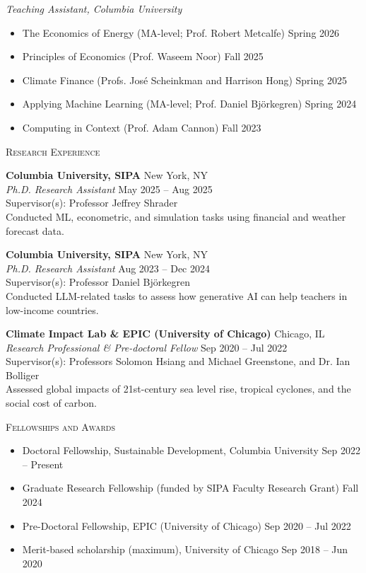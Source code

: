\documentclass[11pt, letterpaper]{article}
\newcommand{\cvsection}[1]{%
    \par\vspace{9pt}%
    {\Large\scshape #1}\ \hrulefill\par\nopagebreak
    \vspace{3pt}%
}
\newcommand{\workentry}[6]{%
    \textbf{#1} \hfill #2\\
    \textit{#3} \hfill #4\\
    Supervisor(s): #5\\
    #6\par\vspace{4pt}%
}
\newenvironment{datedlist}
    {\begin{itemize}[noitemsep,topsep=0pt,partopsep=0pt,leftmargin=0pt,label={}]}
    {\end{itemize}\vspace{4pt}}
\begin{document}
\textit{Teaching Assistant, Columbia University}\par\vspace{2pt}
\begin{datedlist}
    \item The Economics of Energy (MA-level; Prof. Robert Metcalfe) \hfill Spring 2026
    \item Principles of Economics (Prof. Waseem Noor) \hfill Fall 2025
    \item Climate Finance (Profs. José Scheinkman and Harrison Hong) \hfill Spring 2025
    \item Applying Machine Learning (MA-level; Prof. Daniel Björkegren) \hfill Spring 2024
    \item Computing in Context (Prof. Adam Cannon) \hfill Fall 2023
\end{datedlist}


\cvsection{Research Experience}

\workentry{Columbia University, SIPA}{New York, NY}
{Ph.D. Research Assistant}{May 2025 -- Aug 2025}
{Professor Jeffrey Shrader}
{Conducted ML, econometric, and simulation tasks using financial and weather forecast data.}

\workentry{Columbia University, SIPA}{New York, NY}
{Ph.D. Research Assistant}{Aug 2023 -- Dec 2024}
{Professor Daniel Björkegren}
{Conducted LLM-related tasks to assess how generative AI can help teachers in low-income countries.}

\workentry{Climate Impact Lab \& EPIC (University of Chicago)}{Chicago, IL}
{Research Professional \& Pre-doctoral Fellow}{Sep 2020 -- Jul 2022}
{Professors Solomon Hsiang and Michael Greenstone, and Dr. Ian Bolliger}
{Assessed global impacts of 21st-century sea level rise, tropical cyclones, and the social cost of carbon.}


\cvsection{Fellowships and Awards}

\begin{datedlist}
    \item Doctoral Fellowship, Sustainable Development, Columbia University \hfill Sep 2022 -- Present
    \item Graduate Research Fellowship (funded by SIPA Faculty Research Grant) \hfill Fall 2024
    \item Pre-Doctoral Fellowship, EPIC (University of Chicago) \hfill Sep 2020 -- Jul 2022
    \item Merit-based scholarship (maximum), University of Chicago \hfill Sep 2018 -- Jun 2020
\end{datedlist}
\end{document}
